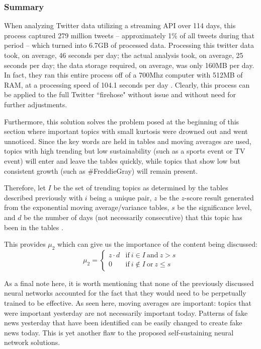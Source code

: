 \documentclass[preprint,review,12pt]{elsarticle}
\begin{document}
\subsubsection{Summary}
\label{what is being shared summary}
When analyzing Twitter data utilizing a streaming API over 114 days, this process captured 279 million tweets -- approximately 1\% of all tweets during that period -- which turned into 6.7GB of processed data. Processing this twitter data took, on average, 46 seconds per day; the actual analysis took, on average, 25 seconds per day; the data storage required, on average, was only 160MB per day. In fact, they ran this entire process off of a 700Mhz computer with 512MB of RAM, at a processing speed of 104.1 seconds per day \cite{schubert2014signitrend}. Clearly, this process can be applied to the full Twitter ``firehose" without issue and without need for further adjustments.

Furthermore, this solution solves the problem posed at the beginning of this section where important topics with small kurtosis were drowned out and went unnoticed. Since the key words are held in tables and moving averages are used, topics with high trending but low sustainability (such as a sports event or TV event) will enter and leave the tables quickly, while topics that show low but consistent growth (such as \#FreddieGray) will remain present. 

Therefore, let $I$ be the set of trending topics as determined by the tables described previously with $i$ being a unique pair, $z$ be the $z$-score result generated from the exponential moving average/variance tables, $s$ be the significance level, and $d$ be the number of days (not necessarily consecutive) that this topic has been in the tables .

This provides $\mu_2$ which can give us the importance of the content being discussed:
\begin{equation}
\label{mu_2 equation}
    \mu_2 = \begin{cases}
    z\cdot d  & \text{if}\ i \in I\ \text{and}\  z > s \\
    0\  & \text{if}\ i \notin I \ \text{or} \ z \leq s
    \end{cases}
\end{equation}

As a final note here, it is worth mentioning that none of the previously discussed neural networks accounted for the fact that they would need to be perpetually trained to be effective. As seen here, moving averages are important: topics that were important yesterday are not necessarily important today. Patterns of fake news yesterday that have been identified can be easily changed to create fake news today. This is yet another flaw to the proposed self-sustaining neural network solutions.
\end{document}
